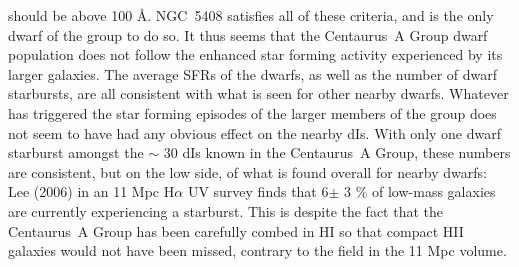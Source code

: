 \documentclass[preprint]{aastex}
\begin{document}
should be above 100 \AA \citep{lee09}. NGC~5408 satisfies all 
of these criteria, and is the only dwarf of the group to do so.  It thus seems
that the Centaurus~A Group dwarf population does not follow the enhanced 
star forming activity experienced by its larger galaxies. The average SFRs
of the dwarfs, as well as the number of dwarf starbursts,
are all consistent with what is seen for other nearby dwarfs. Whatever
has triggered the star forming episodes of the larger members of the
group does not seem to have had any obvious effect on the nearby dIs. 
With only one dwarf starburst amongst the $\sim $ 30 dIs known in the 
Centaurus~A Group, these numbers are consistent, but on the low side, of what is found
overall for nearby dwarfs: Lee (2006) in an 11 Mpc H$\alpha$ UV survey 
finds that 6$\pm$ 3 \% of low-mass galaxies are currently experiencing
a starburst. This is despite the fact that the Centaurus~A Group
has been carefully combed in HI so that compact HII galaxies would not have been
missed, contrary to the field in the 11 Mpc volume. 
\end{document}
